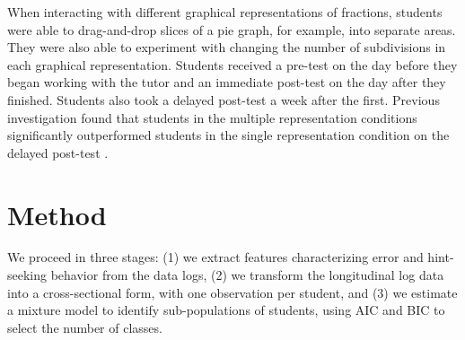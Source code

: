 \documentclass{edm_template}
\begin{document}
When interacting with different graphical representations of fractions, students were able to drag-and-drop slices of a pie graph, for example, into separate areas. They were also able to experiment with changing the number of subdivisions in each graphical representation. Students received a pre-test on the day before they began working with the tutor and an immediate post-test on the day after they finished. Students also took a delayed post-test a week after the first. Previous investigation found that students in the multiple representation conditions significantly outperformed students in the single representation condition on the delayed post-test \cite{Rau2012,Rau2012b}. 


 
\section{Method}
\label{sec:method}

We proceed in three stages: (1) we extract features characterizing error and hint-seeking behavior from the data logs, (2) we transform the longitudinal log data into a cross-sectional form, with one observation per student, and (3) we estimate a mixture model to identify sub-populations of students, using AIC and BIC to select the number of classes. 
\end{document}
